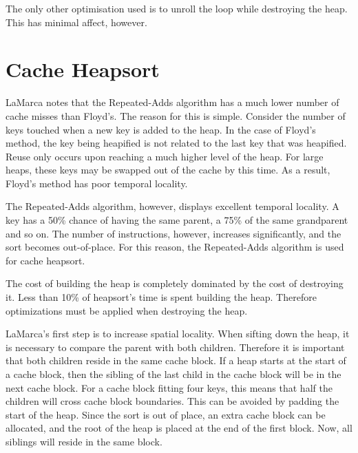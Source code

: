 The only other optimisation used is to unroll the loop while destroying the
heap. This has minimal affect, however.

\section{Cache Heapsort}

LaMarca notes that the Repeated-Adds algorithm has a much lower number of cache
misses than Floyd's. The reason for this is simple. Consider the number of keys 
touched when a new key is added to the heap. In the case of Floyd's method, the
key being heapified is not related to the last key that was heapified. Reuse
only occurs upon reaching a much higher level of the heap. For large heaps, these
keys may be swapped out of the cache by this time. As a result, Floyd's method
has poor temporal locality.

The Repeated-Adds algorithm, however, displays excellent temporal locality. A
key has a 50\% chance of having the same parent, a 75\% of the same grandparent
and so on. The number of instructions, however, increases significantly, and the
sort becomes out-of-place. For this reason, the Repeated-Adds algorithm is used
for cache heapsort.

The cost of building the heap is completely dominated by the cost of
destroying it. Less than 10\% of heapsort's time is spent building the heap.
Therefore optimizations must be applied when destroying the heap.

LaMarca's first step is to increase spatial locality. When sifting down the
heap, it is necessary to compare the parent with both children. Therefore it is
important that both children reside in the same cache block. If a heap starts at
the start of a cache block, then the sibling of the last child in the cache
block will be in the next cache block.  For a cache block fitting four keys,
this means that half the children will cross cache block boundaries. This can be
avoided by padding the start of the heap. Since the sort is out of place, an
extra cache block can be allocated, and the root of the heap is placed at the end of
the first block. Now, all siblings will reside in the same block.

\begin{figure}[h]
\centering
{}
\end{figure}

